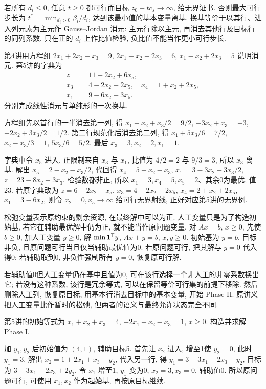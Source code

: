 若所有 $d_i\le0$, 任意 $t\ge0$ 都可行而目标 $z_0+t\bar c_s\to\infty$, 给无界证书. 否则最大可行步长为 $t^*=\min_{d_i>0}\beta_i/d_i$, 达到该最小值的基本变量离基. 换基等价于以其行、进入列元素为主元作 Gauss--Jordan 消元: 主元行除以主元, 再消去其他行及目标行的同列系数. 只在正的 $d_i$ 上作比值检验, 负比值不能当作更小可行步长.

\begin{example}
第4讲用方程组 $2x_1+2x_2+x_3=9$, $2x_1-x_2+2x_3=6$, $x_1-x_2+2x_3=5$ 说明消元. 第5讲的字典为
\begin{align*}
z&=11-2x_2+6x_5,\\
x_3&=4-2x_2-2x_5,\quad x_4=1+x_2+2x_5,\\
x_1&=9-6x_2-3x_5.
\end{align*}
分别完成线性消元与单纯形的一次换基.
\end{example}
\begin{solution}
方程组先以首行的一半消去第一列, 得 $x_1+x_2+x_3/2=9/2$, $-3x_2+x_3=-3$, $-2x_2+3x_3/2=1/2$. 第二行规范化后消去第二列, 得 $x_1+5x_3/6=7/2$, $x_2-x_3/3=1$, $5x_3/6=5/2$. 最后 $x_3=3,x_2=2,x_1=1$.

字典中令 $x_5$ 进入. 正限制来自 $x_3$ 与 $x_1$, 比值为 $4/2=2$ 与 $9/3=3$, 所以 $x_3$ 离基. 解出 $x_5=2-x_2-x_3/2$, 代回得 $x_4=5-x_2-x_3$, $x_1=3-3x_2+3x_3/2$, $z=23-8x_2-3x_3$. 检验数都非正, 所以 $x_1=3,x_4=5,x_5=2$、其余0为最优, 值23. 若原字典改为 $z=6-2x_2+x_5$, $x_3=4-2x_2+2x_5$, $x_4=2+x_2+2x_5$, $x_1=3-6x_2$, 则令 $x_2=0,x_5\to\infty$ 给可行无界射线, 正好对应第5讲的无界例.
\end{solution}

松弛变量表示原约束的剩余资源, 在最终解中可以为正. 人工变量只是为了构造初始基, 若它在辅助最优解中仍为正, 就不能当作原问题变量. 对 $Ax=b$, $x\ge0$, 先使 $b\ge0$, 加人工变量 $y\ge0$, 解
$\min\mathbf1^{\mathsf T} y$, $Ax+y=b$, $x,y\ge0$. 初始基为 $y=b$. 目标非负, 且原问题可行当且仅当辅助最优值为0. 若原问题可行, 把其解与 $y=0$ 代入得0; 若辅助取到0, 非负性强制所有 $y=0$, 恢复原可行解.

若辅助值0但人工变量仍在基中且值为0, 可在该行选择一个非人工的非零系数换出它; 若没有这种系数, 该行是冗余等式, 可以在保留等价可行集的前提下移除. 然后删除人工列, 恢复原目标, 用基本行消去目标中的基本变量, 开始 Phase II. 原讲义把人工变量比作暂时的松弛, 但两者的语义与最终允许状态完全不同.

\begin{example}
第5讲的初始等式为 $x_1+x_2+x_3=4$, $-2x_1+x_2-x_3=1$, $x\ge0$. 构造并求解 Phase I.
\end{example}
\begin{solution}
加 $y_1,y_2$ 后初始值为 $(4,1)$, 辅助目标5. 首先让 $x_2$ 进入, 增至1使 $y_2=0$, 此时 $y_1=3$. 解出 $x_2=1+2x_1+x_3-y_2$, 代入另一行, 得 $y_1=3-3x_1-2x_3+y_2$, 目标为 $3-3x_1-2x_3+2y_2$. 令 $x_1$ 增至1, $y_1$ 变为0, $x_2=3,x_3=0$, 辅助值0. 所以原问题可行, 可使用 $x_1,x_2$ 作为起始基, 再按原目标继续.
\end{solution}

